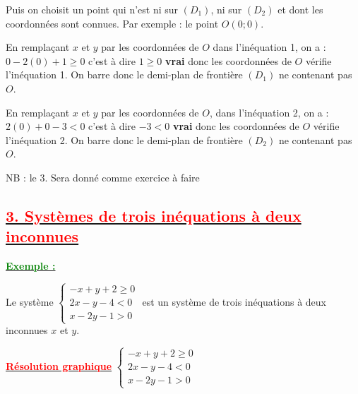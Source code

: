 \documentclass[12pt,a4paper]{article}
\newcounter{exemple}
\newcommand{\exemple}{%
  \refstepcounter{exemple}%
  \textbf{\textcolor{green}{Exemple \theexemple :}} \ignorespaces
}
\begin{document}
\vspace{0.5cm}

Puis on choisit un point qui n'est ni sur $(D_1)$, ni sur $(D_2)$ et dont les coordonnées sont connues. Par exemple : le point $O(0; 0)$.

\vspace{0.2cm}

En remplaçant $x$ et $y$ par les coordonnées de $O$ dans l'inéquation 1, on a : $0 - 2(0) + 1 \geq 0$ c'est à dire $1 \geq 0$ \textbf{vrai} donc les coordonnées de $O$ vérifie l'inéquation 1. On barre donc le demi-plan de frontière $(D_1)$ ne contenant pas $O$.

\vspace{0.2cm}

En remplaçant $x$ et $y$ par les coordonnées de $O$, dans l'inéquation 2, on a : $2(0) + 0 - 3 < 0$ c'est à dire $-3 < 0$ \textbf{vrai} donc les coordonnées de $O$ vérifie l'inéquation 2. On barre donc le demi-plan de frontière $(D_2)$ ne contenant pas $O$.

\vspace{0.2cm}

NB : le 3. Sera donné comme exercice à faire

\subsection*{\underline{\textbf{\textcolor{red}{3. Systèmes de trois inéquations à deux inconnues }}}}

\underline{\exemple}

\noindent Le système
$
\begin{cases}
-x + y + 2 \geq 0 \\
2x - y - 4 < 0 \\
x - 2y - 1 > 0
\end{cases}
$
est un système de trois inéquations à deux inconnues $x$ et $y$.

\underline{\textbf{\textcolor{red}{Résolution graphique}}}
$
\begin{cases}
-x + y + 2 \geq 0 \\
2x - y - 4 < 0 \\
x - 2y - 1 > 0
\end{cases}
$
\end{document}
